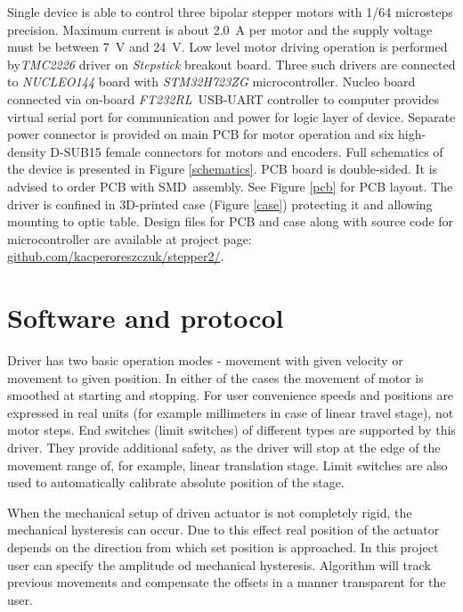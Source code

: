 \documentclass[10pt,article]{article}
\begin{document}
Single device is able to control three bipolar stepper motors with 1/64 microsteps precision. Maximum current is about \SI{2.0}{A} per motor and the supply voltage must be between \SI{7}{V} and \SI{24}{V}.
Low level motor driving operation  is performed by\textit{TMC2226} driver on \textit{Stepstick} breakout board. Three such drivers are connected to \textit{NUCLEO144}  board with \textit{STM32H723ZG} microcontroller. Nucleo board connected via on-board \textit{FT232RL}\ USB-UART controller to computer provides virtual serial port for communication and power for logic layer of device. Separate power connector is provided on main PCB for motor operation and six high-density D-SUB15 female connectors for motors and encoders. Full schematics of the device is presented in Figure \ref{schematics}. PCB board is double-sided. It is advised to order PCB with SMD\ assembly. See Figure \ref{pcb} for PCB layout.  The driver is confined in 3D-printed case (Figure \ref{case}) protecting it and allowing mounting to optic table. 
Design files for PCB and case along with source code for microcontroller are available at project page: \url{github.com/kacperoreszczuk/stepper2/}. 

\newpage
\section{Software and protocol}

Driver has two basic operation modes - movement with given velocity or movement to given position. In either of the cases the movement of motor is smoothed at starting and stopping. For user convenience speeds and positions are expressed in real units (for example millimeters in case of linear travel stage), not motor steps. End switches (limit switches) of different types are supported by this driver. They provide additional safety, as the driver will stop at the edge of the movement range of, for example, linear translation stage. Limit switches are also used to automatically calibrate absolute position of the stage.

When the mechanical setup of driven actuator is not completely rigid, the mechanical hysteresis can occur. Due to this effect real position of the  actuator depends on the direction from which set position is approached. In this project user can specify the amplitude od mechanical hysteresis. Algorithm will track previous movements and compensate the offsets in a manner transparent for the user.  
\end{document}
